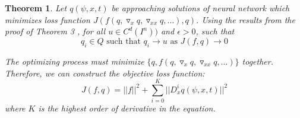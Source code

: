 \documentclass{article}
\newtheorem{theorem}{Theorem}[section]
\begin{document}
\begin{theorem}
	Let $q(\psi,x,t)$ be approaching solutions of  neural network which minimizes loss function $J(f(q,\triangledown_{x}q, \triangledown_{xx}q, \dots),q)$. 
	Using the results from the proof of Theorem 3 \cite{hornik}, for all $u \in C^{d}(I^{n}))$ and $\epsilon > 0$, such that
	\[q_i \in \textit{Q} \textrm{ such that }  q_{i} \rightarrow u  \textrm{ as }J(f,q) \rightarrow 0  \]
	
	The optimizing process must minimize $\{q, f(q,\triangledown_{x}q, \triangledown_{xx}q, \dots)\}$ together.
	Therefore, we can construct the objective loss function:
	\begin{equation}
	J(f,q) = || f ||^{2} + \sum_{i=0}^{K}||D_{x}^{i}q(\psi,x,t) ||^{2}
	\end{equation}
	where $K$ is the highest order of derivative in the equation. 
	
\end{theorem}
\end{document}

